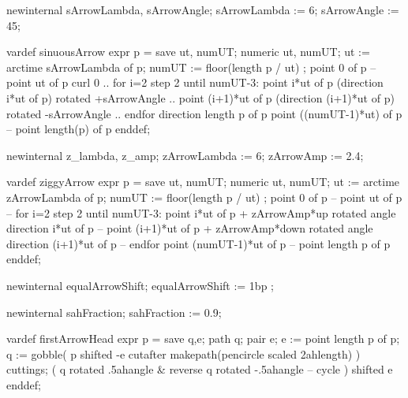 
newinternal sArrowLambda, sArrowAngle;
  sArrowLambda := 6;  %
  sArrowAngle  := 45; %

  vardef sinuousArrow expr p = 
    save ut, numUT; numeric ut, numUT;    
    ut    := arctime sArrowLambda of p;
    numUT := floor(length p / ut) ;
    point 0 of p --
    point ut of p {curl 0} ..
      for i=2 step 2 until numUT-3:
        point     i*ut of p
          { (direction     i*ut of p) rotated +sArrowAngle } ..
        point (i+1)*ut of p
          { (direction (i+1)*ut of p) rotated -sArrowAngle } ..
      endfor
    { direction length p of p } point ((numUT-1)*ut) of p --
    point length(p) of p
  enddef;

  newinternal z_lambda, z_amp;
  zArrowLambda := 6;   %
  zArrowAmp    := 2.4; %

  vardef ziggyArrow expr p = 
    save ut, numUT; numeric ut, numUT;    
    ut    := arctime zArrowLambda of p;
    numUT := floor(length p / ut) ;
    point 0 of p -- point ut of p --
      for i=2 step 2 until numUT-3:
        point     i*ut of p +
          zArrowAmp*up   rotated angle direction     i*ut of p --
        point (i+1)*ut of p +
          zArrowAmp*down rotated angle direction (i+1)*ut of p --
      endfor
    point (numUT-1)*ut of p -- point length p of p
  enddef;
  
  newinternal equalArrowShift;
  equalArrowShift := 1bp ;
    

  newinternal sahFraction;
  sahFraction := 0.9; 
  
  
  vardef firstArrowHead expr p =
    save q,e; path q; pair e;
    e := point length p of p;
    q := gobble(
      p shifted -e 
      cutafter makepath(pencircle scaled 2ahlength)
    ) cuttings;
    (
      q rotated .5ahangle &
      reverse q rotated -.5ahangle --
      cycle
    )  shifted e
  enddef;
  
